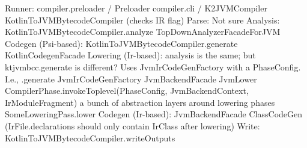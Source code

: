 \documentclass{article}
\begin{document}
 Runner: compiler.preloader / Preloader \textSafeTo compiler.cli / K2JVMCompiler \textSafeTo KotlinToJVMBytecodeCompiler (checks IR flag)
Parse: Not sure
Analysis: KotlinToJVMBytecodeCompiler.analyze \textSafeTo TopDownAnalyzerFacadeForJVM
Codegen (Psi-based): KotlinToJVMBytecodeCompiler.generate \textSafeTo KotlinCodegenFacade
Lowering (Ir-based): analysis is the same; but ktjvmbcc.generate is different? Uses JvmIrCodeGenFactory with a PhaseConfig. I.e., .generate \textSafeTo JvmIrCodeGenFactory \textSafeTo JvmBackendFacade \textSafeTo JvmLower \textSafeTo CompilerPhase.invokeToplevel(PhaseConfig, JvmBackendContext, IrModuleFragment) \textSafeTo a bunch of abstraction layers around lowering phases \textSafeTo SomeLoweringPass.lower
Codegen (Ir-based): JvmBackendFacade \textSafeTo ClassCodeGen (IrFile.declarations should only contain IrClass after lowering)
Write: KotlinToJVMBytecodeCompiler.writeOutputs



\newpage
\printnomenclature
\end{document}
